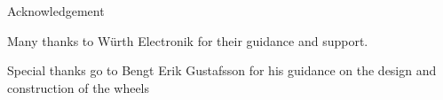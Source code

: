 
\begin{frame}{Acknowledgement}

    \begin{center}

        Many thanks to Würth Electronik for their guidance and support. 

        Special thanks go to Bengt Erik Gustafsson for his guidance on the design and construction of the wheels

    \end{center}
    
\end{frame}

